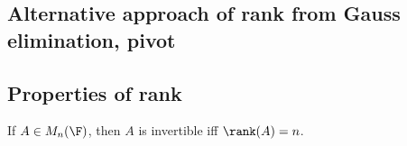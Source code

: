 


\subsection{Alternative approach of rank from Gauss elimination, pivot}










\subsection{Properties of rank}



\begin{theorem}\label{thm:invertible_full_rank}
If $A\in M_n(\F)$, then $A$ is invertible iff $\rank(A) = n$.%
\end{theorem}

